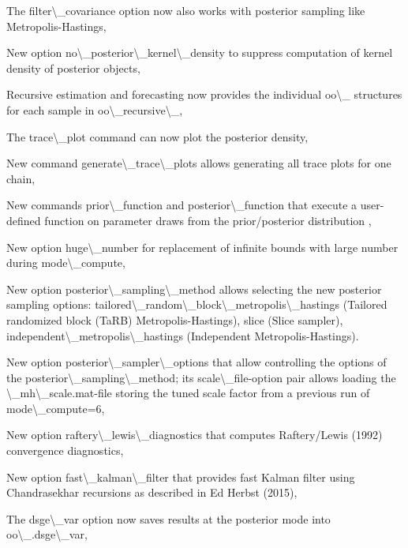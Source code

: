\documentclass[10pt,math=newtx,citestyle=gb7714-2015,bibstyle=gb7714-2015]{elegantbook}
\begin{document}
	
	The filter\textbackslash{}\_covariance option now also works with posterior sampling like Metropolis-Hastings,
	
	
	New option no\textbackslash{}\_posterior\textbackslash{}\_kernel\textbackslash{}\_density to suppress computation of kernel density of posterior objects,
	
	
	Recursive estimation and forecasting now provides the individual
	oo\textbackslash{}\_ structures for each sample in oo\textbackslash{}\_recursive\textbackslash{}\_,
	
	
	The trace\textbackslash{}\_plot command can now plot the posterior density,
	
	
	New command generate\textbackslash{}\_trace\textbackslash{}\_plots allows generating all trace plots for one chain,
	
	
	New commands prior\textbackslash{}\_function and posterior\textbackslash{}\_function that execute a user-defined function on parameter draws from the prior/posterior distribution ,
	
	
	New option huge\textbackslash{}\_number for replacement of infinite bounds with large number during mode\textbackslash{}\_compute,
	
	
	New option posterior\textbackslash{}\_sampling\textbackslash{}\_method allows selecting the new posterior sampling options: tailored\textbackslash{}\_random\textbackslash{}\_block\textbackslash{}\_metropolis\textbackslash{}\_hastings (Tailored randomized block (TaRB) Metropolis-Hastings), slice (Slice sampler), independent\textbackslash{}\_metropolis\textbackslash{}\_hastings (Independent Metropolis-Hastings).
	
	
	New option posterior\textbackslash{}\_sampler\textbackslash{}\_options that allow controlling the options of the posterior\textbackslash{}\_sampling\textbackslash{}\_method; its scale\textbackslash{}\_file-option pair allows loading the \textbackslash{}\_mh\textbackslash{}\_scale.mat-file storing the tuned scale factor from a previous run of mode\textbackslash{}\_compute=6,
	
	
	New option raftery\textbackslash{}\_lewis\textbackslash{}\_diagnostics that computes Raftery/Lewis (1992) convergence diagnostics,
	
	
	New option fast\textbackslash{}\_kalman\textbackslash{}\_filter that provides fast Kalman filter using Chandrasekhar recursions as described in Ed Herbst (2015),
	
	
	The dsge\textbackslash{}\_var option now saves results at the posterior mode into oo\textbackslash{}\_.dsge\textbackslash{}\_var,
	
\end{document}
